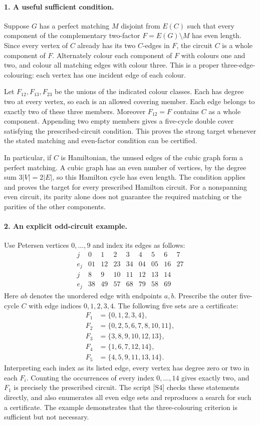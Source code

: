\documentclass[11pt,a4paper]{article}
\begin{document}
\paragraph{1. A useful sufficient condition.}
Suppose $G$ has a perfect matching $M$ disjoint from $E(C)$ such
that every component of the complementary two-factor $F=E(G)\setminus M$
has even length. Since every vertex of $C$ already has its two
$C$-edges in $F$, the circuit $C$ is a whole component of $F$.
Alternately colour each component of $F$ with colours one and two,
and colour all matching edges with colour three. This is a proper
three-edge-colouring: each vertex has one incident edge of each colour.

Let $F_{12},F_{13},F_{23}$ be the unions of the indicated colour
classes. Each has degree two at every vertex, so each is an allowed
covering member. Each edge belongs to exactly two of these three
members. Moreover $F_{12}=F$ contains $C$ as a whole component.
Appending two empty members gives a five-cycle double cover satisfying
the prescribed-circuit condition. This proves the strong target whenever
the stated matching and even-factor condition can be certified.

In particular, if $C$ is Hamiltonian, the unused edges of the cubic
graph form a perfect matching. A cubic graph has an even number
of vertices, by the degree sum $3|V|=2|E|$, so this Hamilton cycle
has even length. The condition applies and proves the target for
every prescribed Hamilton circuit. For a nonspanning even circuit,
its parity alone does not guarantee the required matching or the
parities of the other components.

\paragraph{2. An explicit odd-circuit example.}
Use Petersen vertices $0,\ldots,9$ and index its edges as follows:
\[
\begin{array}{c|rrrrrrrr}
 j&0&1&2&3&4&5&6&7\\
 e_j&01&12&23&34&04&05&16&27\\[2pt]
 j&8&9&10&11&12&13&14&\\
 e_j&38&49&57&68&79&58&69&
\end{array}
\]
Here $ab$ denotes the unordered edge with endpoints $a,b$.
Prescribe the outer five-cycle $C$ with edge indices $0,1,2,3,4$.
The following five sets are a certificate:
\[
\begin{aligned}
 F_1&=\{0,1,2,3,4\},\\
 F_2&=\{0,2,5,6,7,8,10,11\},\\
 F_3&=\{3,8,9,10,12,13\},\\
 F_4&=\{1,6,7,12,14\},\\
 F_5&=\{4,5,9,11,13,14\}.
\end{aligned}
\]
Interpreting each index as its listed edge, every vertex has degree
zero or two in each $F_i$. Counting the occurrences of every index
$0,\ldots,14$ gives exactly two, and $F_1$ is precisely the
prescribed circuit. The script [S4] checks these statements directly,
and also enumerates all even edge sets and reproduces a search for
such a certificate. The example demonstrates that the three-colouring
criterion is sufficient but not necessary.
\end{document}
